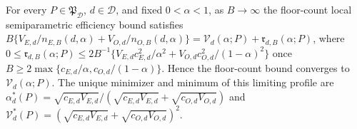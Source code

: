 For every \(P\in\mathfrak P_{\mathcal D}\), \(d\in\mathcal D\), and fixed \(0<\alpha<1\), as \(B\to\infty\) the floor-count local semiparametric efficiency bound satisfies \(B\{V_{E,d}/n_{E,B}(d,\alpha)+V_{O,d}/n_{O,B}(d,\alpha)\}=\mathcal V_d(\alpha;P)+\mathfrak r_{d,B}(\alpha;P)\), where \(0\le\mathfrak r_{d,B}(\alpha;P)\le 2B^{-1}\{V_{E,d}c_{E,d}^2/\alpha^2+V_{O,d}c_{O,d}^2/(1-\alpha)^2\}\) once \(B\ge2\max\{c_{E,d}/\alpha,c_{O,d}/(1-\alpha)\}\). Hence the floor-count bound converges to \(\mathcal V_d(\alpha;P)\). The unique minimizer and minimum of this limiting profile are \(\alpha_d^*(P)=\sqrt{c_{E,d}V_{E,d}}/(\sqrt{c_{E,d}V_{E,d}}+\sqrt{c_{O,d}V_{O,d}})\) and \(\mathcal V_d^*(P)=(\sqrt{c_{E,d}V_{E,d}}+\sqrt{c_{O,d}V_{O,d}})^2\).